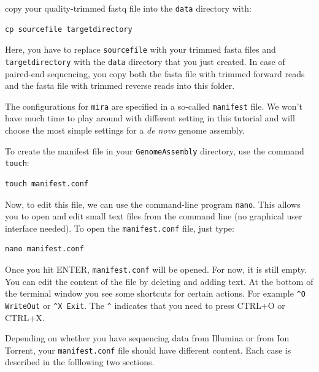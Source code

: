 \documentclass[11pt]{article}
\begin{document}
copy your quality-trimmed fastq file into the \texttt{data} directory with:

\begin{verbatim}
cp sourcefile targetdirectory
\end{verbatim}

Here, you have to replace \texttt{sourcefile} with your trimmed fasta files
and \texttt{targetdirectory} with the \texttt{data} directory that you just created.
In case of paired-end sequencing, you copy both the fasta file with
trimmed forward reads and the fasta file with trimmed reverse reads
into this folder.



The configurations for \texttt{mira} are specified in a so-called
\texttt{manifest} file. We won't have much time to play around with different
setting in this tutorial and will choose the most simple settings for
a \emph{de novo} genome assembly.




To create the manifest file in your \texttt{GenomeAssembly} directory, use
the command \texttt{touch}:

\begin{verbatim}
touch manifest.conf
\end{verbatim}

Now, to edit this file, we can use the command-line program
\texttt{nano}. This allows you to open and edit small text files from the command
line (no graphical user interface needed). To open the \texttt{manifest.conf}
file, just type:

\begin{verbatim}
nano manifest.conf
\end{verbatim}

Once you hit ENTER, \texttt{manifest.conf} will be opened. For now, it is
still empty. You can edit the content of the file by deleting and
adding text. At the bottom of the terminal window you see some
shortcuts for certain actions. For example \texttt{\textasciicircum{}O WriteOut} or 
\texttt{\textasciicircum{}X Exit}. The \texttt{\textasciicircum{}} indicates that you need to press CTRL+O or CTRL+X.

Depending on whether you have sequencing data from Illumina or from
Ion Torrent, your \texttt{manifest.conf} file should have different
content. Each case is described in the folllowing two sections.
\end{document}
